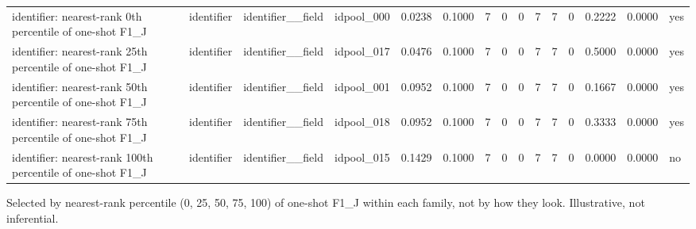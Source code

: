 \begin{table}[t]
{\begin{tabular}{lllllllllllllll}
identifier: nearest-rank 0th percentile of one-shot F1\_J & identifier & identifier\_\_field & idpool\_000 & 0.0238 & 0.1000 & 7 & 0 & 0 & 7 & 7 & 0 & 0.2222 & 0.0000 & yes \\
identifier: nearest-rank 25th percentile of one-shot F1\_J & identifier & identifier\_\_field & idpool\_017 & 0.0476 & 0.1000 & 7 & 0 & 0 & 7 & 7 & 0 & 0.5000 & 0.0000 & yes \\
identifier: nearest-rank 50th percentile of one-shot F1\_J & identifier & identifier\_\_field & idpool\_001 & 0.0952 & 0.1000 & 7 & 0 & 0 & 7 & 7 & 0 & 0.1667 & 0.0000 & yes \\
identifier: nearest-rank 75th percentile of one-shot F1\_J & identifier & identifier\_\_field & idpool\_018 & 0.0952 & 0.1000 & 7 & 0 & 0 & 7 & 7 & 0 & 0.3333 & 0.0000 & yes \\
identifier: nearest-rank 100th percentile of one-shot F1\_J & identifier & identifier\_\_field & idpool\_015 & 0.1429 & 0.1000 & 7 & 0 & 0 & 7 & 7 & 0 & 0.0000 & 0.0000 & no \\
\bottomrule
\end{tabular}}
\par\smallskip\parbox{\linewidth}{\tiny Selected by nearest-rank percentile (0, 25, 50, 75, 100) of one-shot F1\_J within each family, not by how they look. Illustrative, not inferential.}
\end{table}
